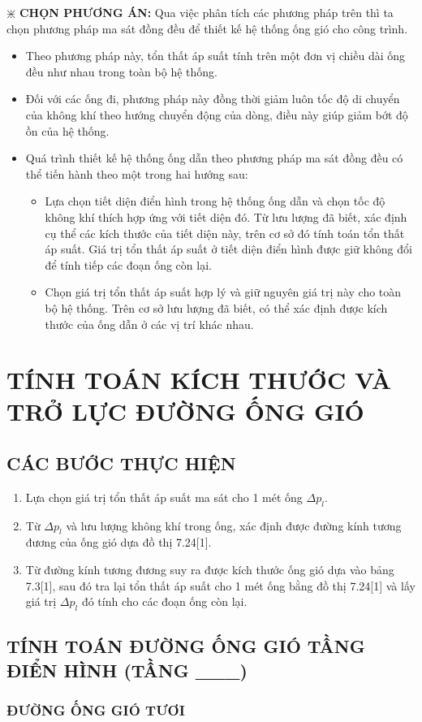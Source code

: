 $\divideontimes$ \textbf{CHỌN PHƯƠNG ÁN:} Qua việc phân tích các phương pháp trên thì ta chọn phương pháp ma sát đồng đều để thiết kế hệ thống ống gió cho công trình.
\begin{itemize}
	\item Theo phương pháp này, tổn thất áp suất tính trên một đơn vị chiều dài ống đều như nhau trong toàn bộ hệ thống.
	\item Đối với các ống đi, phương pháp này đồng thời giảm luôn tốc độ di chuyển của không khí theo hướng chuyển động của dòng, điều này giúp giảm bớt độ ồn của hệ thống.
	\item Quá trình thiết kế hệ thống ống dẫn theo phương pháp ma sát đồng đều có thể tiến hành theo một trong hai hướng sau:
	\begin{itemize}[label={$\circledast$}]
		\item Lựa chọn tiết diện điển hình trong hệ thống ống dẫn và chọn tốc độ không khí thích hợp ứng với tiết diện đó. Từ lưu lượng đã biết, xác định cụ thể các kích thước của tiết diện này, trên cơ sở đó tính toán tổn thất áp suất. Giá trị tổn thất áp suất ở tiết diện
		điển hình được giữ không đổi để tính tiếp các đoạn ống còn lại.
		\item Chọn giá trị tổn thất áp suất hợp lý và giữ nguyên giá trị này cho toàn bộ hệ thống. Trên cơ sở lưu lượng đã biết, có thể xác định được kích thước của ống dẫn ở các vị trí khác nhau.
	\end{itemize}
\end{itemize}

\section{TÍNH TOÁN KÍCH THƯỚC VÀ TRỞ LỰC ĐƯỜNG ỐNG GIÓ}
\subsection{CÁC BƯỚC THỰC HIỆN}
\begin{enumerate}
	\item Lựa chọn giá trị tổn thất áp suất ma sát cho 1 mét ống $\Delta p_{l}$.
	\item Từ $\Delta p_{l}$ và lưu lượng không khí trong ống, xác định được đường kính tương đương của ống gió dựa đồ thị 7.24[1].
	\item Từ đường kính tương đương suy ra được kích thước ống gió dựa vào bảng 7.3[1], sau đó tra lại tổn thất áp suất cho 1 mét ống bằng đồ thị 7.24[1] và lấy giá trị $\Delta p_{l}$ đó tính cho các đoạn ống còn lại.
\end{enumerate}

\subsection{TÍNH TOÁN ĐƯỜNG ỐNG GIÓ TẦNG ĐIỂN HÌNH (TẦNG \_\_\_)}
\subsubsection{ĐƯỜNG ỐNG GIÓ TƯƠI}






